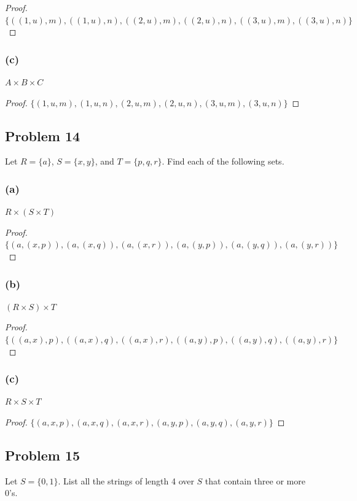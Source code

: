\documentclass[14pt]{extarticle}
\begin{document}
\begin{proof}
    $\{((1, u), m), ((1, u), n), ((2, u), m),
        ((2, u), n), ((3, u), m), ((3, u), n)\}$
\end{proof}

\subsubsection{(c)}
$A \times B \times C$

\begin{proof}
    $\{(1, u, m), (1, u, n), (2, u, m), (2, u, n), (3, u, m), (3, u, n)\}$
\end{proof}

\subsection{Problem 14}
Let $R = \{a\}$, $S = \{x, y\}$, and $T = \{p, q, r\}$. Find each of the
following sets.

\subsubsection{(a)}
$R \times (S \times T)$

\begin{proof}
    $\{(a, (x, p)), (a, (x, q)), (a, (x, r)), (a, (y, p)),
        (a, (y, q)), (a, (y, r))\}$
\end{proof}

\subsubsection{(b)}
$(R \times S) \times T$

\begin{proof}
    $\{((a, x), p), ((a, x), q), ((a, x), r), ((a, y), p),
        ((a, y), q), ((a, y), r)\}$
\end{proof}

\subsubsection{(c)}
$R \times S \times T$

\begin{proof}
    $\{(a, x, p), (a, x, q), (a, x, r), (a, y, p), (a, y, q), (a, y, r)\}$
\end{proof}

\subsection{Problem 15}
Let $S = \{0, 1\}$. List all the strings of length 4 over $S$ that contain three
or more 0’s.
\end{document}
